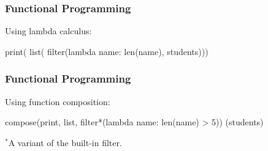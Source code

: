 \documentclass{plt}
\begin{document}
\begin{frame}[fragile]
  \frametitle{Functional Programming}
Using lambda calculus:

\vspace{10pt}

\begin{python}
print(
 list(
  filter(lambda name: len(name), students)))
\end{python}
\end{frame}

\begin{frame}[fragile]
  \frametitle{Functional Programming}
Using function composition:

\vspace{10pt}

\begin{python}
compose(print, list, filter*(lambda name: len(name) > 5))
       (students)
\end{python}

\vspace{50pt}
\tiny{$^*$A variant of the built-in filter.}
\end{frame}
\end{document}

